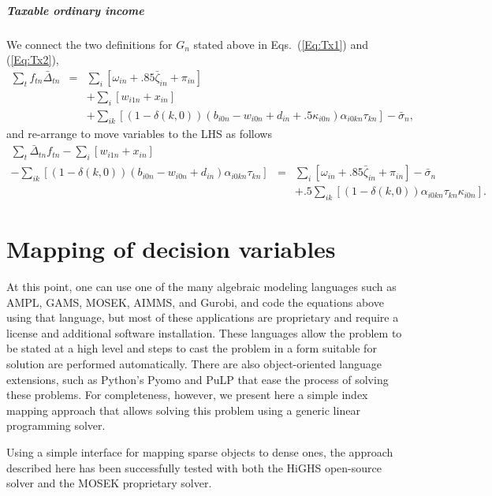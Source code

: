 \documentclass{report}[fleqn,12pt]
\begin{document}
\paragraph*{Taxable ordinary income}
	We connect the two definitions for $G_n$ stated above in Eqs.~(\ref{Eq:Tx1}) and (\ref{Eq:Tx2}),
	\begin{eqnarray}
		\sum_t f_{t n}\bar{\Delta}_{t n} &=&
		\sum_i [\omega_{in} + .85\bar\zeta_{in} + \pi_{in}]  \nonumber \\
		&& + \sum_{i} [w_{i1n} + x_{in} ]
		\nonumber\\
		&& + \sum_{ik} [(1 - \delta(k, 0))(b_{i0n} - w_{i0n} + d_{in} + .5\kappa_{i0n})\alpha_{i0kn}\tau_{kn}] - \bar{\sigma}_n,
	\end{eqnarray}
	and re-arrange to move variables to the LHS as follows
	\begin{eqnarray}
		\label{Eq:C6}
		\sum_t \bar{\Delta}_{t n} f_{t n}
		- \sum_{i} [ w_{i1n} + x_{in}] &&
		\nonumber \\
		- \sum_{ik} [(1 - \delta(k, 0))(b_{i0n} - w_{i0n} + d_{in})\alpha_{i0kn}\tau_{kn}] &=&
		\sum_i [\omega_{in} + .85\bar\zeta_{in} + \pi_{in} ] 
		- \bar{\sigma}_n
		\nonumber \\
		&& + .5\sum_{ik} [(1-\delta(k, 0))\alpha_{i0kn}\tau_{kn}\kappa_{i0n}].
	\end{eqnarray}

\chapter{Mapping of decision variables}
At this point, one can use one of the many algebraic modeling languages
such as AMPL, GAMS, MOSEK, AIMMS, and Gurobi, and code the equations above
using that language, but most of these applications are
proprietary and require a license and additional software installation.
These languages allow the problem to be stated at a high level and
steps to cast the problem in a form suitable for solution are performed automatically.
There are also object-oriented language extensions, such as Python's Pyomo
and PuLP that ease the process of solving these problems.
For completeness, however, we present here a simple
index mapping approach that allows solving this problem using a generic
linear programming solver.

Using a simple interface for mapping sparse objects to dense ones, the approach described here
has been successfully tested with both the HiGHS open-source solver
and the MOSEK proprietary solver.
\end{document}
